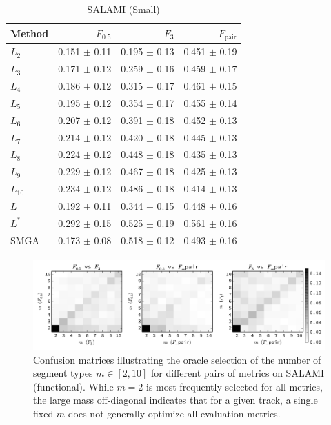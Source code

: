 \documentclass{article}
\begin{document}
\begin{table}
\centering
\caption{ SALAMI (Small)\label{results:salami:small}}
\small
\begin{tabular}{lrrr}
\toprule
Method & $F_{0.5}$ & $F_3$ & $F_\text{pair}$\\
\midrule
$L_2$   & 0.151 $\pm$ 0.11 & 0.195 $\pm$ 0.13   & 0.451 $\pm$ 0.19\\
$L_3$   & 0.171 $\pm$ 0.12 & 0.259 $\pm$ 0.16   & 0.459 $\pm$ 0.17\\
$L_4$   & 0.186 $\pm$ 0.12 & 0.315 $\pm$ 0.17   & 0.461 $\pm$ 0.15\\
$L_5$   & 0.195 $\pm$ 0.12 & 0.354 $\pm$ 0.17   & 0.455 $\pm$ 0.14\\
$L_6$   & 0.207 $\pm$ 0.12 & 0.391 $\pm$ 0.18   & 0.452 $\pm$ 0.13\\
$L_7$   & 0.214 $\pm$ 0.12 & 0.420 $\pm$ 0.18   & 0.445 $\pm$ 0.13\\
$L_8$   & 0.224 $\pm$ 0.12 & 0.448 $\pm$ 0.18   & 0.435 $\pm$ 0.13\\
$L_9$   & 0.229 $\pm$ 0.12 & 0.467 $\pm$ 0.18   & 0.425 $\pm$ 0.13\\
$L_{10}$& 0.234 $\pm$ 0.12 & 0.486 $\pm$ 0.18   & 0.414 $\pm$ 0.13\\
\midrule
$L$     & 0.192 $\pm$ 0.11 & 0.344 $\pm$ 0.15   & 0.448 $\pm$ 0.16\\
$L^*$   & 0.292 $\pm$ 0.15 & 0.525 $\pm$ 0.19   & 0.561 $\pm$ 0.16\\
\midrule
SMGA    & 0.173 $\pm$ 0.08 & 0.518 $\pm$ 0.12   & 0.493 $\pm$ 0.16\\
\bottomrule
\end{tabular}
\end{table}

\begin{figure}
\centering
\includegraphics[width=\textwidth]{figs/mconfusionfunc}
\caption{Confusion matrices illustrating the oracle selection of the number of segment
types $m\in [2, 10]$ for different pairs of metrics on SALAMI (functional). 
While $m=2$ is most frequently selected for all metrics, the large mass off-diagonal 
indicates that for a given track, a single fixed $m$ does not generally optimize all 
evaluation metrics.\label{mconfusion}}
\end{figure}
\end{document}
